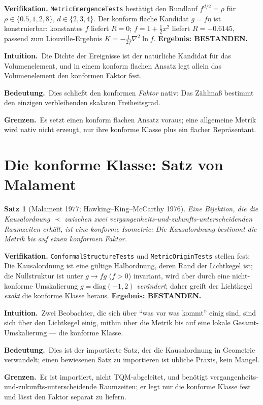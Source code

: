 \documentclass[10pt,twoside,openany]{book}
\newtheorem{theorem}{Satz}[chapter]
\newcommand{\theoremnotes}[3]{%
  \par\medskip\noindent
  \textbf{Intuition.}\ #1\par
  \textbf{Bedeutung.}\ #2\par
  \textbf{Grenzen.}\ #3\par}
\begin{document}
\textbf{Verifikation.} \texttt{MetricEmergenceTests} bestätigt den Rundlauf
$f^{d/2}=\rho$ für $\rho\in\{0.5,1,2,8\}$, $d\in\{2,3,4\}$. Der konform flache Kandidat
$g=f\eta$ ist konstruierbar: konstantes $f$ liefert $R=0$; $f=1+\tfrac12 x^2$ liefert
$R=-0.6145$, passend zum Liouville-Ergebnis $K=-\tfrac1{2f}\nabla^2\ln f$.
\textbf{Ergebnis: BESTANDEN.}

\theoremnotes
{Die Dichte der Ereignisse ist der natürliche Kandidat für das Volumenelement, und in
einem konform flachen Ansatz legt allein das Volumenelement den konformen Faktor fest.}
{Dies schließt den konformen \emph{Faktor} nativ: Das Zählmaß bestimmt den einzigen
verbleibenden skalaren Freiheitsgrad.}
{Es setzt einen konform flachen Ansatz voraus; eine allgemeine Metrik wird nativ nicht
erzeugt, nur ihre konforme Klasse plus ein flacher Repräsentant.}

\section{Die konforme Klasse: Satz von Malament}

\begin{theorem}[Malament 1977; Hawking--King--McCarthy 1976]
Eine Bijektion, die die Kausalordnung $\prec$ zwischen zwei
vergangenheits-und-zukunfts-unterscheidenden Raumzeiten erhält, ist eine konforme
Isometrie: Die Kausalordnung bestimmt die Metrik \emph{bis auf einen konformen Faktor}.
\end{theorem}

\textbf{Verifikation.} \texttt{ConformalStructureTests} und \texttt{MetricOriginTests}
stellen fest: Die Kausalordnung ist eine gültige Halbordnung, deren Rand der Lichtkegel
ist; die Nullstruktur ist unter $g\to f g$ ($f>0$) invariant, wird aber durch eine
nicht-konforme Umskalierung $g=\mathrm{diag}(-1,2)$ \emph{verändert}; daher greift der
Lichtkegel \emph{exakt} die konforme Klasse heraus. \textbf{Ergebnis: BESTANDEN.}

\theoremnotes
{Zwei Beobachter, die sich über ``was vor was kommt'' einig sind, sind sich über den
Lichtkegel einig, mithin über die Metrik bis auf eine lokale Gesamt-Umskalierung --- die
konforme Klasse.}
{Dies ist der importierte Satz, der die Kausalordnung in Geometrie verwandelt; einen
bewiesenen Satz zu importieren ist übliche Praxis, kein Mangel.}
{Er ist importiert, nicht TQM-abgeleitet, und benötigt
vergangenheits-und-zukunfts-unterscheidende Raumzeiten; er legt nur die konforme Klasse
fest und lässt den Faktor separat zu liefern.}
\end{document}
